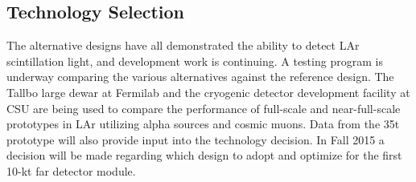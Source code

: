 \subsection{Technology Selection}

The alternative designs have all demonstrated the ability to detect
LAr scintillation light, and development work is continuing. A testing
program is underway comparing the various alternatives against the
reference design.  The Tallbo large dewar at Fermilab and the
cryogenic detector development facility at CSU are being used to
compare the performance of full-scale and near-full-scale prototypes
in LAr utilizing alpha sources and cosmic muons. Data from the 35t
prototype will also provide input into the technology decision. In
Fall 2015 a decision will be made regarding which design to adopt and
optimize for the first 10-kt far detector module.


